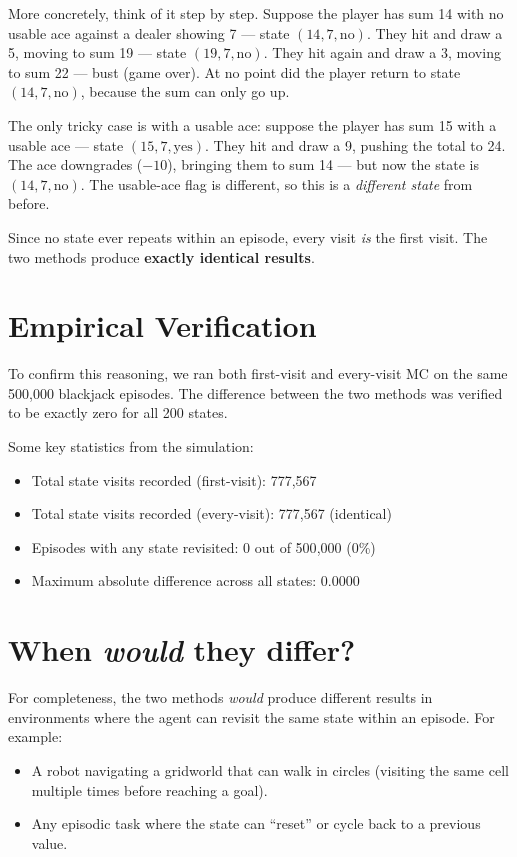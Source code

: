 \documentclass[11pt]{article}
\begin{document}
More concretely, think of it step by step. Suppose the player has sum 14 with no usable ace against a dealer showing 7 --- state $(14, 7, \text{no})$. They hit and draw a 5, moving to sum 19 --- state $(19, 7, \text{no})$. They hit again and draw a 3, moving to sum 22 --- bust (game over). At no point did the player return to state $(14, 7, \text{no})$, because the sum can only go up.

The only tricky case is with a usable ace: suppose the player has sum 15 with a usable ace --- state $(15, 7, \text{yes})$. They hit and draw a 9, pushing the total to 24. The ace downgrades ($-10$), bringing them to sum 14 --- but now the state is $(14, 7, \text{no})$. The usable-ace flag is different, so this is a \textit{different state} from before.

Since no state ever repeats within an episode, every visit \textit{is} the first visit. The two methods produce \textbf{exactly identical results}.

\section*{Empirical Verification}

To confirm this reasoning, we ran both first-visit and every-visit MC on the same 500{,}000 blackjack episodes. The difference between the two methods was verified to be exactly zero for all 200 states.

Some key statistics from the simulation:
\begin{itemize}[nosep]
    \item Total state visits recorded (first-visit): 777{,}567
    \item Total state visits recorded (every-visit): 777{,}567 (identical)
    \item Episodes with any state revisited: 0 out of 500{,}000 (0\%)
    \item Maximum absolute difference across all states: 0.0000
\end{itemize}

\section*{When \textit{would} they differ?}

For completeness, the two methods \textit{would} produce different results in environments where the agent can revisit the same state within an episode. For example:

\begin{itemize}[nosep]
    \item A robot navigating a gridworld that can walk in circles (visiting the same cell multiple times before reaching a goal).
    \item Any episodic task where the state can ``reset'' or cycle back to a previous value.
\end{itemize}
\end{document}
